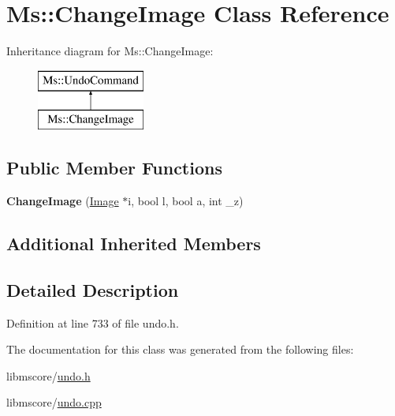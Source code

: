 \hypertarget{class_ms_1_1_change_image}{}\section{Ms\+:\+:Change\+Image Class Reference}
\label{class_ms_1_1_change_image}
Inheritance diagram for Ms\+:\+:Change\+Image\+:\begin{figure}[H]
\begin{center}
\leavevmode
\includegraphics[height=2.000000cm]{class_ms_1_1_change_image}
\end{center}
\end{figure}
\subsection*{Public Member Functions}
\begin{DoxyCompactItemize}
\item 
\mbox{\label{class_ms_1_1_change_image_a1ac42fe2ba90237445b489b43cbfc521}} 
{\bfseries Change\+Image} (\hyperlink{class_ms_1_1_image}{Image} $\ast$i, bool l, bool a, int \+\_\+z)
\end{DoxyCompactItemize}
\subsection*{Additional Inherited Members}


\subsection{Detailed Description}


Definition at line 733 of file undo.\+h.



The documentation for this class was generated from the following files\+:\begin{DoxyCompactItemize}
\item 
libmscore/\hyperlink{undo_8h}{undo.\+h}\item 
libmscore/\hyperlink{undo_8cpp}{undo.\+cpp}\end{DoxyCompactItemize}
